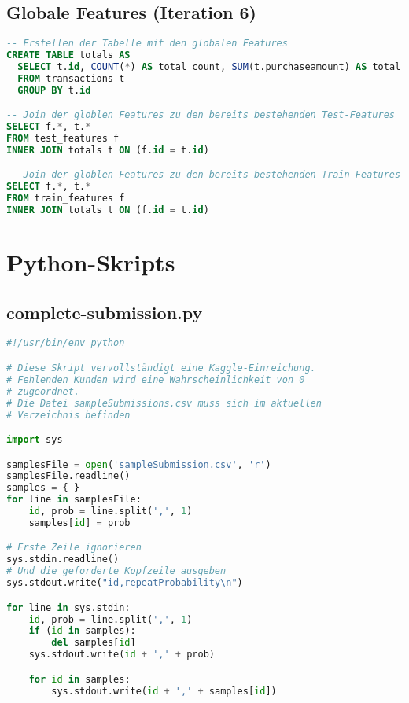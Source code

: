 \subsection{Globale Features (Iteration 6)}
\label{code:totals}
\begin{lstlisting}[language=SQL]
-- Erstellen der Tabelle mit den globalen Features
CREATE TABLE totals AS
  SELECT t.id, COUNT(*) AS total_count, SUM(t.purchaseamount) AS total_spent
  FROM transactions t
  GROUP BY t.id

-- Join der globlen Features zu den bereits bestehenden Test-Features
SELECT f.*, t.*
FROM test_features f
INNER JOIN totals t ON (f.id = t.id)

-- Join der globlen Features zu den bereits bestehenden Train-Features
SELECT f.*, t.*
FROM train_features f
INNER JOIN totals t ON (f.id = t.id)
\end{lstlisting}

\section{Python-Skripts}
\subsection{complete-submission.py}
\label{code:complete-submission}
\begin{lstlisting}[language=Python]
#!/usr/bin/env python

# Diese Skript vervollständigt eine Kaggle-Einreichung.
# Fehlenden Kunden wird eine Wahrscheinlichkeit von 0 
# zugeordnet.
# Die Datei sampleSubmissions.csv muss sich im aktuellen 
# Verzeichnis befinden

import sys

samplesFile = open('sampleSubmission.csv', 'r')
samplesFile.readline()
samples = { }
for line in samplesFile:
	id, prob = line.split(',', 1)
	samples[id] = prob

# Erste Zeile ignorieren
sys.stdin.readline()
# Und die geforderte Kopfzeile ausgeben
sys.stdout.write("id,repeatProbability\n")

for line in sys.stdin:
	id, prob = line.split(',', 1)
	if (id in samples):
		del samples[id]
	sys.stdout.write(id + ',' + prob)

	for id in samples:
		sys.stdout.write(id + ',' + samples[id])
\end{lstlisting}


